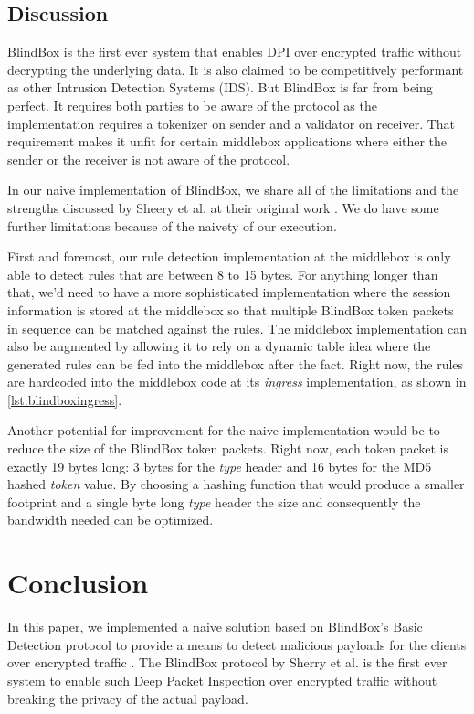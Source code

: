 \documentclass{winslabreport}
\begin{document}
\subsection{Discussion}

BlindBox is the first ever system that enables DPI over encrypted traffic without decrypting the underlying data. It is also claimed to be competitively performant as other Intrusion Detection Systems (IDS). But BlindBox is far from being perfect. It requires both parties to be aware of the protocol as the implementation requires a tokenizer on sender and a validator on receiver. That requirement makes it unfit for certain middlebox applications where either the sender or the receiver is not aware of the protocol.

In our naive implementation of BlindBox, we share all of the limitations and the strengths discussed by Sheery et al. at their original work \cite{Blindbox}. We do have some further limitations because of the naivety of our execution. 

First and foremost, our rule detection implementation at the middlebox is only able to detect rules that are between 8 to 15 bytes. For anything longer than that, we'd need to have a more sophisticated implementation where the session information is stored at the middlebox so that multiple BlindBox token packets in sequence can be matched against the rules. The middlebox implementation can also be augmented by allowing it to rely on a dynamic table idea where the generated rules can be fed into the middlebox after the fact. Right now, the rules are hardcoded into the middlebox code at its \emph{ingress} implementation, as shown in \autoref{lst:blindboxingress}.

Another potential for improvement for the naive implementation would be to reduce the size of the BlindBox token packets. Right now, each token packet is exactly 19 bytes long: 3 bytes for the \emph{type} header and 16 bytes for the MD5 hashed \emph{token} value. By choosing a hashing function that would produce a smaller footprint and a single byte long \emph{type} header the size and consequently the bandwidth needed can be optimized. 

\section{Conclusion}

In this paper, we implemented a naive solution based on BlindBox's Basic Detection protocol to provide a means to detect malicious payloads for the clients over encrypted traffic . The BlindBox protocol by Sherry et al. is the first ever system to enable such Deep Packet Inspection over encrypted traffic without breaking the privacy of the actual payload. 
\end{document}
